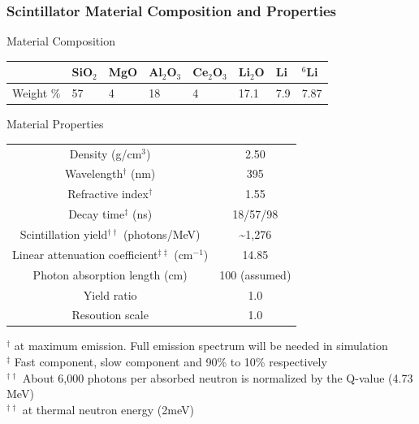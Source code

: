 \documentclass[xcolor=x11names, compress, handout]{beamer}
\renewcommand{\(}{\begin{columns}}
\renewcommand{\)}{\end{columns}}
\newcommand{\<}[1]{\begin{column}{#1}}
\renewcommand{\>}{\end{column}}
\begin{document}
\begin{frame}
\frametitle{Scintillator Material Composition and Properties}
\scriptsize
\begin{block}{Material Composition \cite{spowart_1976}}
\centering 
\begin{tabular}{p{1.7cm} | p{1.0cm} p{1.0cm} p{1.0cm} p{1.0cm} p{1.0cm} p{1.0cm} p{1.0cm}}
 & SiO$_2$ & MgO & Al$_2$O$_3$ & Ce$_2$O$_3$ & Li$_2$O & Li & $^6$Li  \\
 \hline
Weight \% & 57 & 4 & 18 & 4 & 17.1 & 7.9 & 7.87 \\
\end{tabular}
\end{block}

\begin{block}{Material Properties \cite{gs20}}
\centering \scriptsize
\begin{tabular}{c | c }
Density (g/cm$^3$) & 2.50 \\
Wavelength$^\dagger$ (nm) & 395 \\
Refractive index$^\dagger$ & 1.55 \\
Decay time$^\ddagger$ (ns) & 18/57/98 \\
Scintillation yield$^{\dagger\dagger}$ (photons/MeV) &  \textasciitilde 1,276 \\
Linear attenuation coefficient$^{\ddagger\ddagger}$ (cm$^{-1}$) & 14.85 \\
Photon absorption length (cm) & 100 (assumed) \\
Yield ratio & 1.0 \\
Resoution scale & 1.0 \\
\end{tabular}
\end{block}

\scriptsize  
$^\dagger$  at maximum emission. Full emission spectrum will be needed in simulation \\
$^\ddagger$ Fast component, slow component and 90\% to 10\% respectively \\
$^{\dagger\dagger}$ About 6,000 photons per absorbed neutron is normalized by the Q-value (4.73 MeV)\\
$^{\dagger\dagger}$ at thermal neutron energy (2meV) \\

\end{frame}
\end{document}
